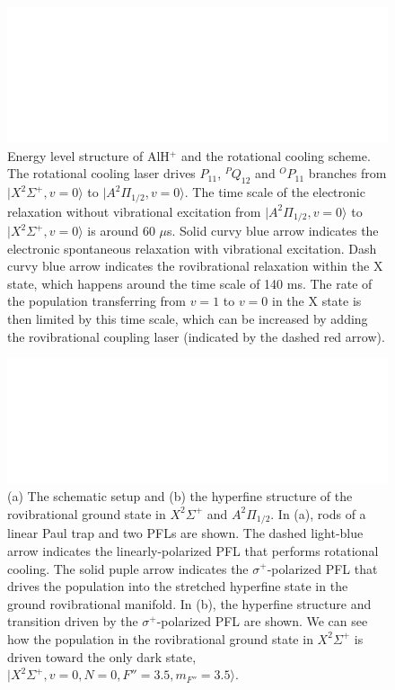 \documentclass[nofootinbib,aip,jcp,reprint]{revtex4-1}
\begin{document}
\maketitle
\begin{figure}[!htp]
  \centering
  \includegraphics[width=14cm]{level_diagram_parity}
  \caption
  {Energy level structure of AlH$^+$ and the rotational cooling scheme. The rotational cooling laser drives $P_{11}$, $^PQ_{12}$ and $^OP_{11}$ branches from $\lvert X^2\Sigma^+, v=0\rangle$ to $\lvert A^2\Pi_{1/2}, v=0\rangle$. The time scale of the electronic relaxation without vibrational excitation from $\lvert A^2\Pi_{1/2}, v=0\rangle$ to $\lvert X^2\Sigma^+, v=0\rangle$ is around 60 $\mu$s. Solid curvy blue arrow indicates the electronic spontaneous relaxation with vibrational excitation. Dash curvy blue arrow indicates the rovibrational relaxation within the X state, which happens around the time scale of 140 ms. The rate of the population transferring from $v=1$ to $v=0$ in the X state is then limited by this time scale, which can be increased by adding the rovibrational coupling laser (indicated by the dashed red arrow).
}\label{level_diagram_parity}
\end{figure}

\begin{figure}[!htp]
  \centering
  \includegraphics[width=14cm]{schematic_setup}
  \caption
  {(a) The schematic setup and (b) the hyperfine structure of the rovibrational ground state in $X^2\Sigma^+$ and $A^2\Pi_{1/2}$. In (a), rods of a linear Paul trap and two PFLs are shown. The dashed light-blue arrow indicates the linearly-polarized PFL that performs rotational cooling. The solid puple arrow indicates the $\sigma^+$-polarized PFL that drives the population into the stretched hyperfine state in the ground rovibrational manifold. In (b), the hyperfine structure and transition driven by the $\sigma^+$-polarized PFL are shown. We can see how the population in the rovibrational ground state in $X^2\Sigma^+$ is driven toward the only dark state, $\lvert X^2\Sigma^+, v=0, N=0, F''=3.5, m_{F''}=3.5\rangle$.
}\label{schematic_setup}
\end{figure}
\end{document}
